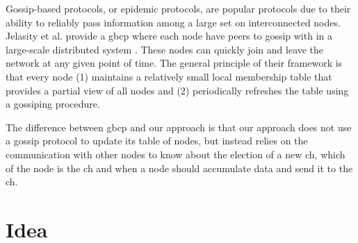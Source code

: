 \documentclass[USenglish]{uit-thesis}
\begin{document}




Gossip-based protocols, or epidemic protocols, are popular protocols due to their ability to reliably pass information among a large set on interconnected nodes. Jelasity et al. \cite{gbsampling} provide a \gls{gbcp} where each node have peers to gossip with in a large-scale distributed system \cite{demers}. These nodes can quickly join and leave the network at any given point of time. The general principle of their framework is that every node (1) maintains a relatively small local membership table that provides a partial view of all nodes and (2) periodically refreshes the table using a gossiping procedure.

The difference between \gls{gbcp} and our approach is that our approach does not use a gossip protocol to update its table of nodes, but instead relies on the communication with other nodes to know about the election of a new \gls{ch}, which of the node is the \gls{ch} and when a node should accumulate data and send it to the \gls{ch}.


\chapter{Idea} \label{chap:idea}



\end{document}
